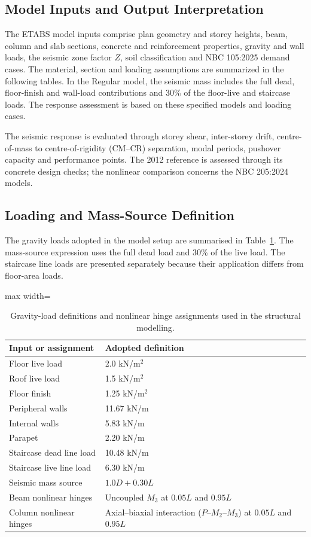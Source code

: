 \subsection{Model Inputs and Output Interpretation}
The ETABS model inputs comprise plan geometry and storey heights, beam, column and slab sections, concrete and reinforcement properties, gravity and wall loads, the seismic zone factor $Z$, soil classification and NBC 105:2025 demand cases. The material, section and loading assumptions are summarized in the following tables. In the Regular model, the seismic mass includes the full dead, floor-finish and wall-load contributions and 30\% of the floor-live and staircase loads. The response assessment is based on these specified models and loading cases.

The seismic response is evaluated through storey shear, inter-storey drift, centre-of-mass to centre-of-rigidity (CM--CR) separation, modal periods, pushover capacity and performance points. The 2012 reference is assessed through its concrete design checks; the nonlinear comparison concerns the NBC 205:2024 models.



\subsection{Loading and Mass-Source Definition}
The gravity loads adopted in the model setup are summarised in Table~\ref{tab:seq035_load_inputs}. The mass-source expression uses the full dead load and 30\% of the live load. The staircase line loads are presented separately because their application differs from floor-area loads.
\begin{table}[!htbp]\centering
\caption{Gravity-load definitions and nonlinear hinge assignments used in the structural modelling.}\label{tab:seq035_load_inputs}
\normalsize
\begin{adjustbox}{max width=\linewidth}
\begin{tabular}{@{}p{}p{}@{}}\toprule
Input or assignment & Adopted definition \\\midrule
Floor live load & 2.0 kN/m$^2$ \\
Roof live load & 1.5 kN/m$^2$ \\
Floor finish & 1.25 kN/m$^2$ \\
Peripheral walls & 11.67 kN/m \\
Internal walls & 5.83 kN/m \\
Parapet & 2.20 kN/m \\
Staircase dead line load & 10.48 kN/m \\
Staircase live line load & 6.30 kN/m \\
Seismic mass source & $1.0D+0.30L$ \\
Beam nonlinear hinges & Uncoupled $M_3$ at $0.05L$ and $0.95L$ \\
Column nonlinear hinges & Axial--biaxial interaction ($P$--$M_2$--$M_3$) at $0.05L$ and $0.95L$ \\
\bottomrule\end{tabular}
\end{adjustbox}
\end{table}

